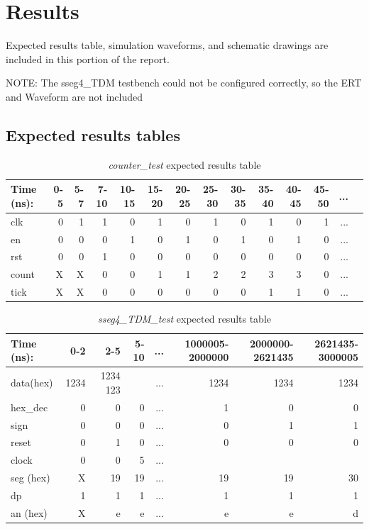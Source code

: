 \documentclass[11pt]{article}
\begin{document}
\section*{Results}
  
Expected results table, simulation waveforms, and schematic drawings are included in this portion of the report.

NOTE: The sseg4\_TDM testbench could not be configured correctly, so the ERT and Waveform are not included

\subsection*{Expected results tables}

\begin{table}[ht]\centering
	\caption{\textit{counter\_test} expected results table}
	\label{ALU:tbl:alu_ERT}\medskip
	\begin{tabular}{l|rrrrrrrrrrrrr}
		Time (ns): & 0-5 & 5-7 & 7-10 & 10-15 & 15-20 & 20-25 & 25-30 & 30-35 & 35-40 & 40-45 & 45-50 &...\\
		\midrule
		clk & 0  & 1 & 1 & 0 & 1 & 0 & 1 & 0 & 1 & 0 & 1 & ... \\
		en & 0 & 0 & 0 & 1 & 0 & 1 & 0 & 1 & 0 & 1 & 0 & ...\\
		rst & 0 & 0 & 1& 0 & 0 & 0 & 0 & 0 & 0 & 0 & 0 & ... \\
		\midrule
		count & X & X & 0 & 0  & 1 & 1 & 2 & 2 & 3 & 3 & 0 & ... \\
		tick & X & X & 0 & 0 & 0 & 0 & 0 & 0 & 1 & 1 & 0& ... \\
		\bottomrule
	\end{tabular}
\end{table}

\begin{table}[ht]\centering
	\caption{\textit{sseg4\_TDM\_test} expected results table}
	\label{ALU:tbl:alu_ERT}\medskip
	\begin{tabular}{l|rrrrrrr}
		Time (ns): & 0-2 & 2-5 & 5-10 & ... & 1000005-2000000 & 2000000-2621435 & 2621435-3000005\\
		\midrule
		data(hex) & 1234 & 1234 123 && ... & 1234  & 1234 & 1234  \\
		hex\_dec & 0 & 0 & 0 & ... & 1 &  0 & 0\\
		sign & 0 & 0 & 0 & ... & 0 &  1 & 1 \\
		reset & 0 & 1 & 0 & ... & 0 & 0 & 0  \\
		clock & 0 & 0 & 5 & ...  \\
		\midrule
		seg (hex) & X & 19 & 19 & ... & 19 & 19 & 30 \\
		dp & 1 & 1 & 1 & ... & 1 & 1 & 1 \\
		an (hex)& X & e & e & ... & e & e & d \\
		\bottomrule
	\end{tabular}
\end{table}
\end{document}
